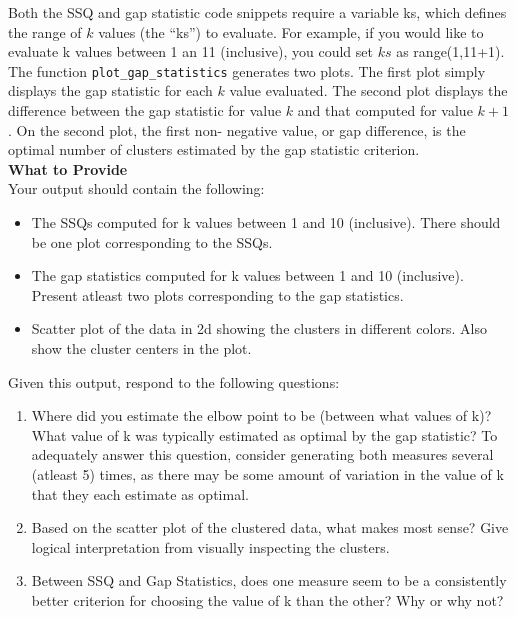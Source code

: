 \documentclass[letter-paper,12pt]{article} %
\begin{document}
Both the SSQ and gap statistic code snippets require a variable ks, which defines the range of $k$ values (the “ks”) to evaluate. For example, if you would like to evaluate k values between 1 an 11 (inclusive), you could set $ks$ as range(1,11+1).\\

The function \texttt{plot\_gap\_statistics} generates two plots. The first plot simply displays the gap statistic for each $k$ value evaluated. The second plot displays the difference between the gap statistic for value $k$ and that computed for value $k+1$. On the second plot, the first non- negative value, or gap difference, is the optimal number of clusters estimated by the gap statistic criterion.\\


\textbf{What to Provide}\\
Your output should contain the following:
\begin{itemize}
    \item The SSQs computed for k values between 1 and 10 (inclusive). There should be one plot corresponding to the SSQs.
    \item The gap statistics computed for k values between 1 and 10 (inclusive). Present atleast  two plots corresponding to the gap statistics.
    \item Scatter plot of the data in 2d showing the clusters in different colors. Also show the cluster centers in the plot. 
\end{itemize}


Given this output, respond to the following questions:
\begin{enumerate}
    \item Where did you estimate the elbow point to be (between what values of k)? What value of k was typically estimated as optimal by the gap statistic? To adequately answer this question, consider generating both measures several (atleast 5) times, as there may be some amount of variation in the value of k that they each estimate as optimal.

    \item Based on the scatter plot of the clustered data, what makes most sense? Give logical interpretation from visually inspecting the clusters. 
    
    \item Between SSQ and Gap Statistics, does one measure seem to be a consistently better criterion for choosing the value of k than the other? Why or why not?
    
    
\end{enumerate}
\end{document}

